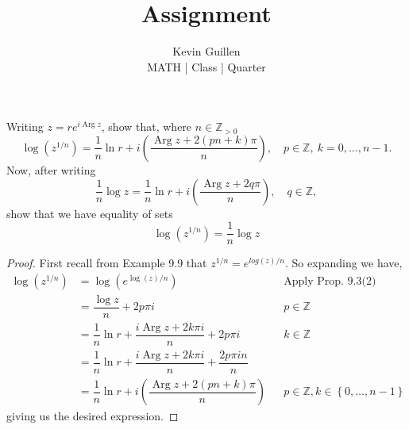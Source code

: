 \documentclass[11pt]{article}
\newenvironment{problem}[2][Problem\!]{\begin{trivlist}
\item[\hskip \labelsep {\bfseries #1}\hskip \labelsep {\bfseries #2}]}{\end{trivlist}}
\newcommand{\zz}{\mathbb Z}   %
\newcommand{\parg}{\operatorname{Arg}}
\newcommand{\lrp}[1]{\left(#1\right)}
\newcommand{\lrc}[1]{\left\{#1\right\}}
\begin{document}
 
\title{Assignment}
\author{Kevin Guillen\\[0.5em]
MATH  | Class | Quarter}
\date{} 
\maketitle


\begin{problem}{5.1}
Writing $z = re^{i\parg z}$, show that, where $n \in \zz_{>0}$
\[\log(z^{1/n}) = \frac{1}{n}\ln r + i\left(\frac{\parg z + 2(pn + k)\pi}{n}\right),\quad p\in\zz,\ k = 0,\ldots,n-1.\]
Now, after writing 
\[\frac{1}{n}\log z = \frac{1}{n}\ln r + i\left(\frac{\parg z + 2q\pi}{n}\right),\quad q \in \zz,\]
show that we have equality of sets
\[\log(z^{1/n}) = \frac{1}{n}\log z\]
\end{problem}
\begin{proof}
    First recall from Example 9.9 that $z^{1/n} = e^{log(z)/n}$. So expanding we have,
    \begin{align*}
        \log(z^{1/n}) &= \log(e^{\log(z) / n}) && \text{Apply Prop. 9.3(2)} \\
        &= \dfrac{\log z}{n } + 2p\pi i  && p\in \zz \\
        &= \dfrac{1}{n}\ln r + \dfrac{i \parg z + 2k\pi i }{n} + 2p\pi i  && k\in \zz \\
        &= \dfrac{1}{n}\ln r + \dfrac{i\parg z + 2k\pi i }{n} + \dfrac{2p \pi i n}{n} \\
        &= \dfrac{1}{n}\ln r + i\lrp{\dfrac{\parg z + 2(pn + k) \pi}{n}} && p\in \zz, k\in \lrc{0, \dots , n-1}
    \end{align*}
    giving us the desired expression. 

\end{proof}

\newpage  %
\end{document}
